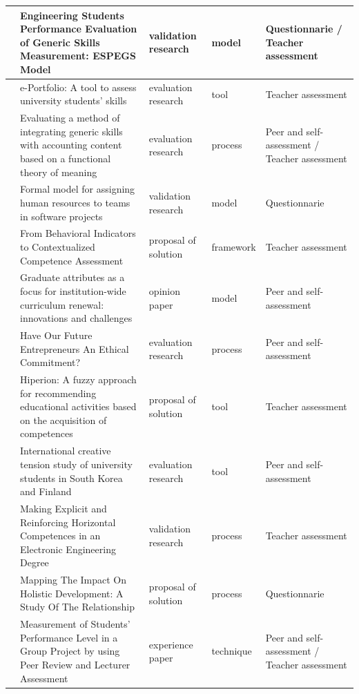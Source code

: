 \begin{landscape}
\begin{center}
\begin{longtable}{| m{2.5cm} | m{9cm} | m{4cm} | m{2.5cm} | m{3.5cm} |}
    \hline
    \cite{rashid2008engineering} & Engineering Students Performance Evaluation of Generic Skills Measurement: ESPEGS Model & validation research & model & Questionnarie / Teacher assessment \\
    \hline
    \cite{rodriguez2010portfolio} & e-Portfolio: A tool to assess university students' skills & evaluation research & tool & Teacher assessment \\
    \hline
    \cite{sin2007evaluating} & Evaluating a method of integrating generic skills with accounting content based on a functional theory of meaning & evaluation research & process & Peer and self-assessment / Teacher assessment \\
    \hline
    \cite{andre2011formal} & Formal model for assigning human resources to teams in software projects & validation research & model & Questionnarie \\
    \hline
    \cite{bedek2011behavioral} & From Behavioral Indicators to Contextualized Competence Assessment & proposal of solution & framework & Teacher assessment \\
    \hline
    \cite{oliver2013graduate} & Graduate attributes as a focus for institution-wide curriculum renewal: innovations and challenges & opinion paper & model & Peer and self-assessment \\
    \hline
    \cite{marquez2010have} & Have Our Future Entrepreneurs An Ethical Commitment? & evaluation research & process & Peer and self-assessment \\
    \hline
    \cite{serrano2013hiperion} & Hiperion: A fuzzy approach for recommending educational activities based on the acquisition of competences & proposal of solution & tool & Teacher assessment \\
    \hline
    \cite{chang2009international} & International creative tension study of university students in South Korea and Finland & evaluation research & tool & Peer and self-assessment \\
    \hline
    \cite{} & Making Explicit and Reinforcing Horizontal Competences in an Electronic Engineering Degree & validation research & process & Teacher assessment \\
    \hline
    \cite{so2011mapping} & Mapping The Impact On Holistic Development: A Study Of The Relationship & proposal of solution & process & Questionnarie \\
    \hline
    \cite{khamis2012measurement} & Measurement of Students' Performance Level in a Group Project by using Peer Review and Lecturer Assessment & experience paper & technique & Peer and self-assessment / Teacher assessment \\

\end{longtable}
\end{center}
\end{landscape}
